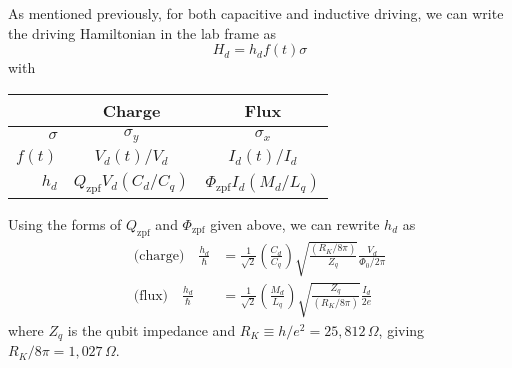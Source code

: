 

As mentioned previously, for both capacitive and inductive driving, we can write the driving Hamiltonian in the lab frame as
\begin{equation*}
  H_d = h_d f(t) \sigma
\end{equation*}
with
\begin{center}
  \begin{tabular}{|r|c|c|}
    \hline
    & \textbf{Charge} & \textbf{Flux} \\
    \hline \hline
    $\sigma$ & $\sigma_y$ & $\sigma_x$ \\
    \hline
    $f(t)$ & $V_d(t)/V_d$ & $I_d(t) / I_d$ \\
    \hline
    $h_d$ & $Q_\text{zpf} V_d(C_d/C_q)$ & $\Phi_\text{zpf} I_d (M_d/L_q)$ \\
    \hline
  \end{tabular}
\end{center}
Using the forms of $Q_\text{zpf}$ and $\Phi_\text{zpf}$ given above, we can rewrite $h_d$ as
\begin{align*}
  \text{(charge)} \quad \frac{h_d}{\hbar} &=
  \frac{1}{\sqrt{2}} \left(\frac{C_d}{C_q} \right) \sqrt{\frac{(R_K / 8\pi)}{Z_q}} \frac{V_d}{\Phi_0/2\pi} \\
  \text{(flux)} \quad \frac{h_d}{\hbar} &=
  \frac{1}{\sqrt{2}} \left( \frac{M_d}{L_q} \right) \sqrt{\frac{Z_q}{(R_K/8\pi)}} \frac{I_d}{2e}
\end{align*}
where $Z_q$ is the qubit impedance and $R_K \equiv h/e^2 = 25,812 \, \Omega$, giving $R_K/8\pi = 1,027 \, \Omega$.


